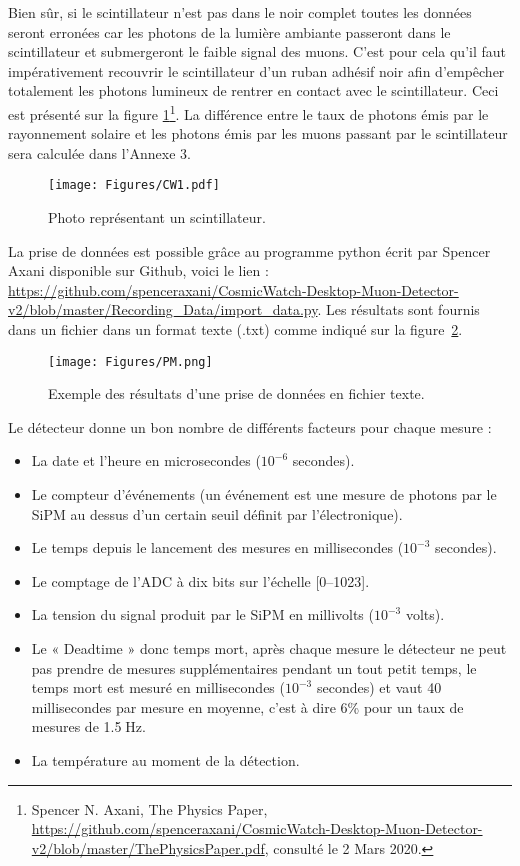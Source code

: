 \documentclass[a4paper, 12pt]{article}
\begin{document}
\begin{spacing}{1.5}
Bien sûr, si le scintillateur n'est pas dans le noir complet toutes les données seront erronées car les photons de la lumière ambiante passeront dans le scintillateur et submergeront le faible signal des muons. C’est pour cela qu’il faut impérativement recouvrir le scintillateur d'un ruban adhésif noir afin d'empêcher totalement les photons lumineux de rentrer en contact avec le scintillateur. Ceci est présenté sur la figure \ref{fig:noir}\footnote{Spencer N. Axani, The Physics Paper, \url{https://github.com/spenceraxani/CosmicWatch-Desktop-Muon-Detector-v2/blob/master/ThePhysicsPaper.pdf}, consulté le 2 Mars 2020.}. La différence entre le taux de photons émis par le rayonnement solaire et les photons émis par les muons passant par le scintillateur sera calculée dans l'Annexe 3. 

\begin{figure}[t]
\begin{center}
\texttt{[image: Figures/CW1.pdf]}
\caption{\label{fig:noir} Photo représentant un scintillateur.}
\end{center}
\end{figure}


La prise de données est possible grâce au programme python écrit par Spencer Axani disponible sur Github, voici le lien : \url{https://github.com/spenceraxani/CosmicWatch-Desktop-Muon-Detector-v2/blob/master/Recording_Data/import_data.py}. Les résultats sont fournis dans un fichier dans un format texte (.txt) comme indiqué sur la figure~\ref{fig:ex.mesurement}.

\begin{figure}[t]
\begin{center}
\texttt{[image: Figures/PM.png]}
\caption{\label{fig:ex.mesurement} Exemple des résultats d'une prise de données en fichier texte.}
\end{center}
\end{figure}

Le détecteur donne un bon nombre de différents facteurs pour chaque mesure :
\begin{itemize}
  \item La date et l'heure en microsecondes ($10^{-6}$ secondes).
  \item Le compteur d'événements (un événement est une mesure de photons par le SiPM au dessus d'un certain seuil définit par l'électronique).
  \item Le temps depuis le lancement des mesures en millisecondes ($10^{-3}$ secondes).
  \item Le comptage de l'ADC à dix bits sur l’échelle [0--1023].
  \item La tension du signal produit par le SiPM en millivolts ($10^{-3}$ volts).
  \item Le « Deadtime » donc temps mort, après chaque mesure le détecteur ne peut pas prendre de mesures supplémentaires pendant un tout petit temps, le temps mort est mesuré en millisecondes ($10^{-3}$ secondes) et vaut 40 millisecondes par mesure en moyenne, c'est à dire 6\% pour un taux de mesures de 1.5$\;$Hz.
  \item La température au moment de la détection.
\end{itemize}



\end{spacing}
\end{document}
